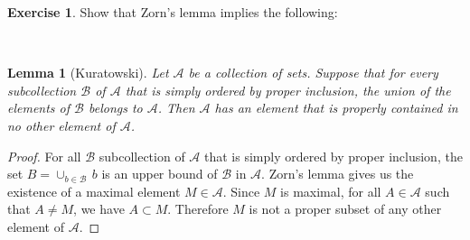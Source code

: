 \documentclass[11pt,a4paper,twoside]{article}
\theoremstyle{definition}
\newcounter{excounter}
\newtheorem{exercise}[excounter]{Exercise}
\theoremstyle{plain}
\newtheorem*{lemma}{Lemma}
\begin{document}
\begin{exercise}

  Show that Zorn's lemma implies the following:

\end{exercise}

~\\
\begin{lemma}[Kuratowski]
  Let $\mathscr{A}$ be a collection of sets. Suppose that for every subcollection
  $\mathscr{B}$ of $\mathscr{A}$ that is simply ordered by proper inclusion, the union of the
  elements of $\mathscr{B}$ belongs to $\mathscr{A}$. Then $\mathscr{A}$ has an element that is
  properly contained in no other element of $\mathscr{A}$.
\end{lemma}

\begin{proof}

  For all $\mathscr{B}$ subcollection of $\mathscr{A}$ that is simply ordered by proper inclusion,
  the set $B = \cup_{b \in \mathscr{B}} \,b$ is an upper bound of $\mathscr{B}$ in $\mathscr{A}$.
  Zorn's lemma gives us the existence of a maximal element $M \in \mathscr{A}$. Since $M$ is maximal,
  for all $A \in \mathscr{A}$ such that $A \neq M$, we have $A \subset M$. Therefore $M$ is not
  a proper subset of any other element of $\mathscr{A}$.

\end{proof}
\end{document}

